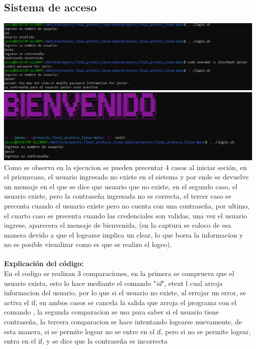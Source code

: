 \documentclass[12pt,a4paper]{article}
\begin{document}
\subsection{Sistema de acceso}
    \justifying
    \noindent
\includegraphics[width=14cm]{img/login1.png}\\
\includegraphics[width=14cm]{img/login2.png}
    Como se observa en la ejecucion se pueden precentar 4 casos al iniciar seción, en el priemrcaso, el usuario ingresado no existe en el sistema y por ende se devuelve un mensaje en el que se dice que usuario que no existe, en el segundo caso, el usuario existe, pero la contraseña ingresada no es correcta, el tercer caso se precenta cuando el usuario existe pero no cuenta con una contraseña, por ultimo, el cuarto caso se precenta cuando las credenciales son validas, una vez el usuario ingrese, aparecera el mensaje de bienvenida, (en la captura se coloco de esa manera devido a que el logearse implica un clear, lo que borra la informacion y no es posible visualizar como es que se realizo el logeo).\\\\
    \noindent
 \textbf{Explicación del código:}\\
    En el codigo se realizan 3 comparaciones, en la primera se comprueva que el usuario exista, esto lo hace mediante el comando "\textit{id}", etext  l cual arroja informacion del usuario, por lo que si el usuario no existe, al errojar un error, se activa el if, en ambos casos se cancela la salida que arroja el programa con el comando , la segunda comparacion se usa para saber si el usuario tiene contraseña, la tercera comparacion se hace intentando logearse nuevamente, de esta manera, si se permite logear no se entre en el if, pero si no se permite logear, entra en el if, y se dice que la contraseña es incorrecta
\end{document}
